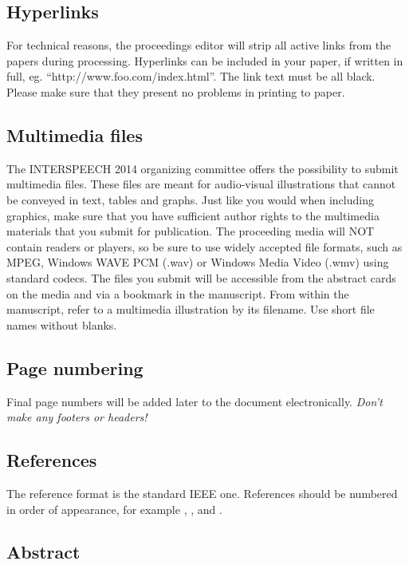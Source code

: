\documentclass[a4paper]{article}
\begin{document}
\subsection{Hyperlinks}

For technical reasons, the proceedings editor will strip all active
links from the papers during processing. Hyperlinks can be included in
your paper, if written in full, eg. ``http://www.foo.com/index.html''.
The link text must be all black. Please make sure that they present no
problems in printing to paper.

\subsection{Multimedia files}

The INTERSPEECH 2014 organizing committee offers the possibility to
submit multimedia files. These files are meant for audio-visual
illustrations that cannot be conveyed in text, tables and graphs.
Just like you would when including graphics, make sure that you have
sufficient author rights to the multimedia materials that you submit
for publication. The proceeding media will NOT contain readers or
players, so be sure to use widely accepted file formats, such as
MPEG, Windows WAVE PCM (.wav) or Windows Media Video (.wmv) using
standard codecs. The files you submit will be accessible from the
abstract cards on the media and via a bookmark in the manuscript.
From within the manuscript, refer to a multimedia illustration by
its filename. Use short file names without blanks.

\subsection{Page numbering}

Final page numbers will be added later to the document
electronically.
{\em Don't make any footers or headers!}

\subsection{References}

The reference format is the standard IEEE one.
References should be numbered in order of appearance,
for example \cite{ES1}, \cite{ES2}, and \cite{ES3}.

\subsection{Abstract}
\end{document}
